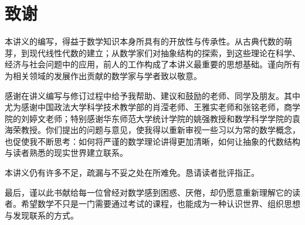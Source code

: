 \documentclass[lang=cn,10.5pt,scheme=chinese,toc=twocol,section,chinesefont=nofont,
twoside,citestyle=gb7714-2015,bibstyle=gb7714-2015]{elegantbook}
\numberwithin{equation}{section}   %
\begin{document}
\printindex

\chapter*{致谢}

本讲义的编写，得益于数学知识本身所具有的开放性与传承性。从古典代数的萌芽，到现代线性代数的建立；从数学家们对抽象结构的探索，到这些理论在科学、经济与社会问题中的应用，前人的工作构成了本讲义最重要的思想基础。谨向所有为相关领域的发展作出贡献的数学家与学者致以敬意。

感谢在讲义编写与修订过程中给予我帮助、建议和鼓励的老师、同学及朋友。其中尤为感谢中国政法大学科学技术教学部的肖滢老师、王雅实老师和张铭老师，商学院的刘婷文老师；特别感谢华东师范大学统计学院的姚强教授和数学科学学院的袁海荣教授。你们提出的问题与意见，使我得以重新审视一些习以为常的数学概念，也促使我不断思考：如何将严谨的数学理论讲得更加清晰，如何让抽象的代数结构与读者熟悉的现实世界建立联系。

本讲义仍有许多不足，疏漏与不妥之处在所难免。恳请读者批评指正。

最后，谨以此书献给每一位曾经对数学感到困惑、厌倦，却仍愿意重新理解它的读者。希望数学不只是一门需要通过考试的课程，也能成为一种认识世界、组织思想与发现联系的方式。
\end{document}

